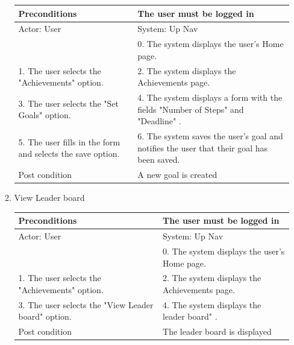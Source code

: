 \documentclass{article}
\begin{document}
\begin{center}
\begin{enumerate}
\begin{enumerate}
	\begin{table}[]
	\centering
		\begin{tabular}{ | m{15em} | m{15em}| }
		\hline
		Preconditions                                                       										& The user must be logged in \\ 				
		\hline
		Actor: User                                                       											& System: Up Nav \\ 			
		\hline
                                                                  													& 0. The system displays the user's Home page. \\                                                           
		 \hline
		1. The user selects the "Achievements" option.										& 2. The system displays the Achievements  page. \\
		 \hline
		3. The user selects the "Set Goals" option. 											& 4.  The system displays a form with the fields "Number of Steps" and "Deadline" . \\
		\hline
		5. The user fills in the form and selects the save option.									& 6. The system saves the user's goal and notifies the user that their goal has been saved. \\
		\hline
		Post condition                                                     										& A new goal is created \\ 			
		\hline
		\end{tabular}
	\end{table}

	\item{View Leader board}

	\begin{table}[]
	\centering
		\begin{tabular}{ | m{15em} | m{15em}| }
		\hline
		Preconditions                                                       										& The user must be logged in \\ 				
		\hline
		Actor: User                                                       											& System: Up Nav \\ 			
		\hline
                                                                  													& 0. The system displays the user's Home page. \\                                                           
		 \hline
		1. The user selects the "Achievements" option.										& 2. The system displays the Achievements  page. \\
		 \hline
		3. The user selects the "View Leader board" option. 										& 4.  The system displays the leader board" . \\
		\hline
		Post condition                                                     										& The leader board is displayed \\ 			
		\hline
		\end{tabular}
	\end{table}


\end{enumerate}
\end{enumerate}
\end{center}
\end{document}
